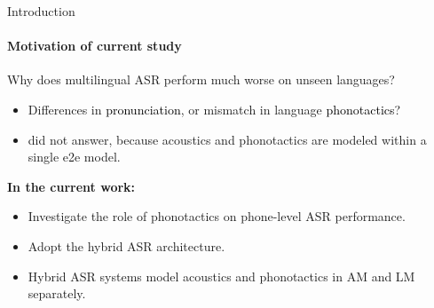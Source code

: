 \documentclass{beamer}
\begin{document}
\begin{frame}{Introduction}
\framesubtitle{Motivation of current study}
Why does multilingual ASR perform much worse on unseen languages?
\begin{itemize}
    \item Differences in  \textcolor{black}{pronunciation}, or  mismatch in language \textcolor{black}{phonotactics}? 
    \item \cite{Zelasko2020That_interspeech} did not answer, because acoustics and phonotactics are modeled within a single e2e model.
\end{itemize}


\begin{block}{}
\textbf{In the current work:}
\begin{itemize}
    \item Investigate the role of phonotactics on phone-level ASR performance.

    \item Adopt the hybrid ASR architecture.
    \item Hybrid ASR systems model acoustics and phonotactics in AM and LM separately.
\end{itemize}
    
\end{block}

\end{frame}
 
\end{document}
